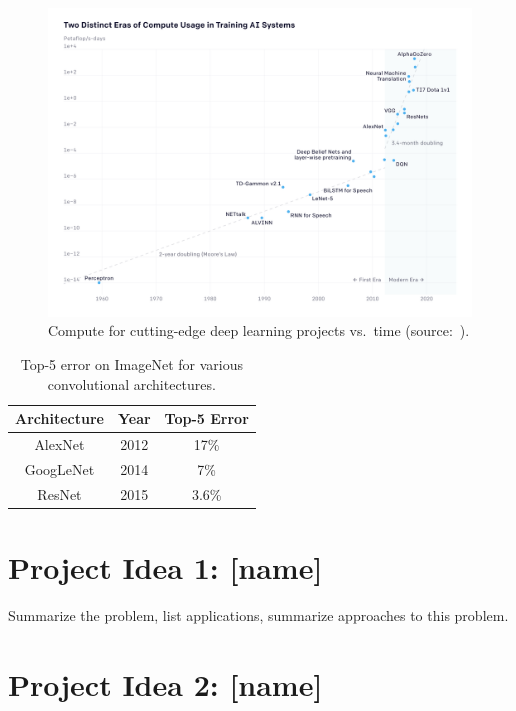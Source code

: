 \documentclass{report}
\begin{document}
\begin{figure}
    \centering
    \includegraphics[width=\textwidth]{figs/ai-and-compute-all-2.png}
    \caption{Compute for cutting-edge deep learning projects vs.\ time (source:~\cite{AI-compute18}).}
    \label{fig:compute}
\end{figure}

\begin{table}[]
    \centering \caption{Top-5 error on ImageNet for various convolutional architectures.}
    \begin{tabular}{|c|c|c|} \hline
      Architecture   &  Year & Top-5 Error \\ \hline
    AlexNet & 2012     & 17\% \\
    GoogLeNet & 2014 & 7\% \\
    ResNet & 2015 & 3.6\% \\ \hline
    \end{tabular}
 
    \label{tab:CNN-perf}
\end{table}

\section{Project Idea 1: [name]}

Summarize the problem, list applications, summarize approaches to this problem. 


\section{Project Idea 2: [name]}
\end{document}
